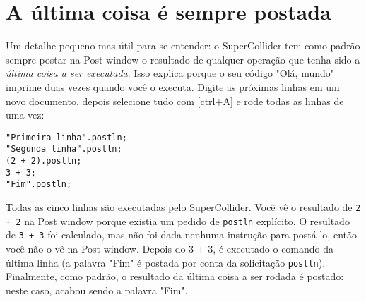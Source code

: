\section{A última coisa é sempre postada}

Um detalhe pequeno mas útil para se entender: o SuperCollider tem como padrão sempre postar na Post window o resultado de qualquer operação que tenha sido a \emph{última coisa a ser executada}. Isso explica porque o seu código "Olá, mundo" imprime duas vezes quando você o executa. Digite as próximas linhas em um novo documento, depois selecione tudo com [ctrl+A] e rode todas as linhas de uma vez:

\begin{lstlisting}[style=SuperCollider-IDE, basicstyle=\scttfamily\footnotesize]
"Primeira linha".postln;
"Segunda linha".postln;
(2 + 2).postln;
3 + 3;
"Fim".postln;
\end{lstlisting}

Todas as cinco linhas são executadas pelo SuperCollider. Você vê o resultado de \texttt{2 + 2} na Post window porque existia um pedido de \texttt{postln} explícito. O resultado de \texttt{3 + 3} foi calculado, mas não foi dada nenhuma instrução para postá-lo, então você não o vê na Post window. Depois do 3 + 3, é executado o comando da última linha (a palavra "Fim" é postada por conta da solicitação \texttt{postln}). Finalmente, como padrão, o resultado da última coisa a ser rodada é postado: neste caso, acabou sendo a palavra "Fim".
